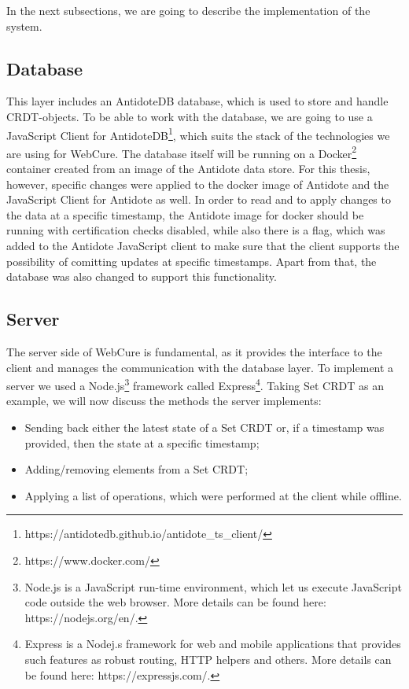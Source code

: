 In the next subsections, we are going to describe the implementation of the system.

\subsection{Database}

This layer includes an AntidoteDB database, which is used to store and handle CRDT-objects. To be able to work with the database, we are going to use a JavaScript Client for AntidoteDB\footnote{https://antidotedb.github.io/antidote\_ts\_client/}, which suits the stack of the technologies we are using for WebCure. The database itself will be running on a Docker\footnote{https://www.docker.com/} container created from an image of the Antidote data store. For this thesis, however, specific changes were applied to the docker image of Antidote and the JavaScript Client for Antidote as well. In order to read and to apply changes to the data at a specific timestamp, the Antidote image for docker should be running with certification checks disabled, while also there is a flag, which was added to the Antidote JavaScript client to make sure that the client supports the possibility of comitting updates at specific timestamps. Apart from that, the database was also changed to support this functionality.

\subsection{Server}
\label{impl-server}

The server side of WebCure is fundamental, as it provides the interface to the client and manages the communication with the database layer. To implement a server we used a Node.js\footnote{Node.js is a JavaScript run-time environment, which let us execute JavaScript code outside the web browser. More details can be found here: https://nodejs.org/en/.} framework called Express\footnote{Express is a Nodej.s framework for web and mobile applications that provides such features as robust routing, HTTP helpers and others. More details can be found here: https://expressjs.com/.}. Taking Set CRDT as an example, we will now discuss the methods the server implements:

\begin{itemize}
    \item {Sending back either the latest state of a Set CRDT or, if a timestamp was provided, then the state at a specific timestamp;}
    \item {Adding/removing elements from a Set CRDT;}
    \item {Applying a list of operations, which were performed at the client while offline.}
\end{itemize}

